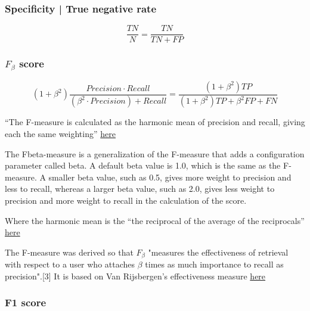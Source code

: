 \documentclass[11pt]{article}
\begin{document}
\subsubsection{Specificity | True negative rate}

\begin{definition}[Specificity]
    \begin{equation*}
        \frac{TN}{N} = \frac{TN}{TN + FP} 
    \end{equation*}
\end{definition}

\subsubsection{$F_\beta$ score}

\begin{definition}
    \begin{equation*}
        (1+\beta^2)\frac{Precision \cdot Recall}{(\beta^2 \cdot Precision) + Recall} = \frac{(1+\beta^2)TP}{(1+\beta^2)TP + \beta^2FP + FN}
    \end{equation*}
\end{definition}

``The F-measure is calculated as the harmonic mean of precision and recall, giving each the same weighting'' \href{https://machinelearningmastery.com/fbeta-measure-for-machine-learning/}{here}


The Fbeta-measure is a generalization of the F-measure that adds a configuration parameter called beta. A default beta value is 1.0, which is the same as the F-measure. A smaller beta value, such as 0.5, gives more weight to precision and less to recall, whereas a larger beta value, such as 2.0, gives less weight to precision and more weight to recall in the calculation of the score.

Where the harmonic mean is the ``the reciprocal of the average of the reciprocals'' \href{https://www.mathsisfun.com/numbers/harmonic-mean.html}{here}

The F-measure was derived so that $F_\beta$ "measures the effectiveness of retrieval with respect to a user who attaches $\beta$ times as much importance to recall as precision".[3] It is based on Van Rijsbergen's effectiveness measure \href{https://en.wikipedia.org/wiki/F-score}{here}

\subsubsection{F1 score}
\end{document}
